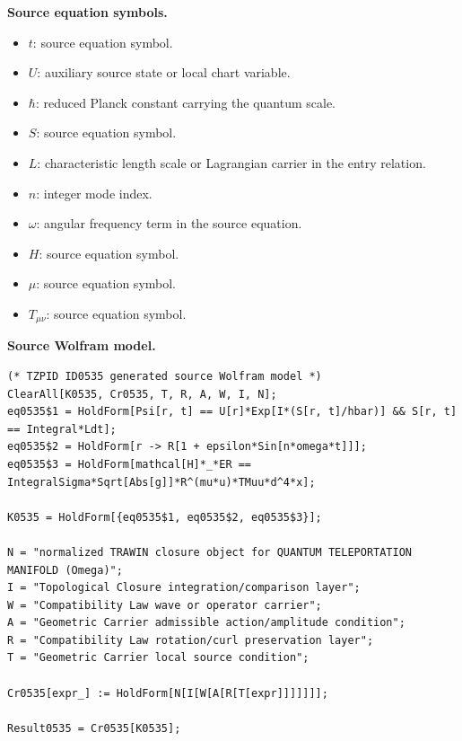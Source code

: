 \begin{minipage}[t]{0.49\linewidth}
\begingroup
\small
\raggedright
\textbf{Source equation symbols.}\par
\begin{itemize}[leftmargin=1.35em,itemsep=1pt,topsep=1pt,parsep=0pt]
    \item $t$: source equation symbol.
    \item $U$: auxiliary source state or local chart variable.
    \item $\hbar$: reduced Planck constant carrying the quantum scale.
    \item $S$: source equation symbol.
    \item $L$: characteristic length scale or Lagrangian carrier in the entry relation.
    \item $n$: integer mode index.
    \item $\omega$: angular frequency term in the source equation.
    \item $H$: source equation symbol.
    \item $\mu$: source equation symbol.
    \item $T_{\mu\nu}$: source equation symbol.
\end{itemize}
\endgroup
\end{minipage}\hfill
\begin{minipage}[t]{0.47\linewidth}
\begingroup
\scriptsize
\raggedright
\textbf{Source Wolfram model.}\par
\begin{Verbatim}[fontsize=\tiny,breaklines=true,breakanywhere=true]
(* TZPID ID0535 generated source Wolfram model *)
ClearAll[K0535, Cr0535, T, R, A, W, I, N];
eq0535$1 = HoldForm[Psi[r, t] == U[r]*Exp[I*(S[r, t]/hbar)] && S[r, t] == Integral*Ldt];
eq0535$2 = HoldForm[r -> R[1 + epsilon*Sin[n*omega*t]]];
eq0535$3 = HoldForm[mathcal[H]*_*ER == IntegralSigma*Sqrt[Abs[g]]*R^(mu*u)*TMuu*d^4*x];

K0535 = HoldForm[{eq0535$1, eq0535$2, eq0535$3}];

N = "normalized TRAWIN closure object for QUANTUM TELEPORTATION MANIFOLD (Omega)";
I = "Topological Closure integration/comparison layer";
W = "Compatibility Law wave or operator carrier";
A = "Geometric Carrier admissible action/amplitude condition";
R = "Compatibility Law rotation/curl preservation layer";
T = "Geometric Carrier local source condition";

Cr0535[expr_] := HoldForm[N[I[W[A[R[T[expr]]]]]]];

Result0535 = Cr0535[K0535];
\end{Verbatim}
\endgroup
\end{minipage}

